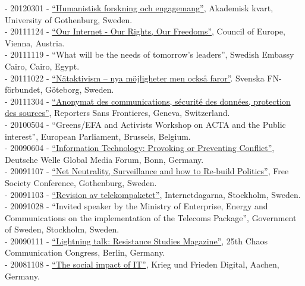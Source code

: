 \documentclass[a4paper,11pt,oneside]{article}
\begin{document}
    - 20120301 - \href{http://www.youtube.com/watch?v=-HYfVmanye8}{``Humanistisk forskning och engagemang''}, Akademisk kvart, University of Gothenburg, Sweden. \\
    - 20111124 - \href{https://www.youtube.com/watch?v=zWROWpMaKmE}{``Our Internet - Our Rights, Our Freedoms''}, Council of Europe, Vienna, Austria. \\
    - 20111119 - ``What will be the needs of tomorrow's leaders'', Swedish Embassy Cairo, Cairo, Egypt. \\
    - 20111022 - \href{http://www.youtube.com/watch?v=6Mi0g93ModU}{``Nätaktivism – nya möjligheter men också faror''}. Svenska FN-förbundet, Göteborg, Sweden. \\
    - 20111304 - \href{http://www.rsf-ch.ch/anonymat-des-communications-s%C3%A9curit%C3%A9-des-donn%C3%A9es-protection-des-sources-0}{``Anonymat des communications, sécurité des données, protection des sources''}, Reporters Sans Frontieres, Geneva, Switzerland. \\
    - 20100504 - ``Greens/EFA and Activists Workshop on ACTA and the Public interest'', European Parliament, Brussels, Belgium. \\
    - 20090604 - \href{https://issuu.com/deutsche-welle/docs/program-deutsche-welle-global-media-forum-2009}{``Information Technology: Provoking or Preventing Conflict''}, Deutsche Welle Global Media Forum, Bonn, Germany. \\
    - 20091107 - \href{https://vimeo.com/10286077}{``Net Neutrality, Surveillance and how to Re-build Politics''}, Free Society Conference, Gothenburg, Sweden. \\
    - 20091103 - \href{https://internetdagarna.se/arkiv/2009/program-2009/3-november.html}{``Revision av telekompaketet''}, Internetdagarna, Stockholm, Sweden. \\
    - 20091028 - ``Invited speaker by the Ministry of Enterprise, Energy and Communications on the implementation of the Telecoms Package'', Government of Sweden, Stockholm, Sweden.\\
    - 20090111 - \href{https://www.youtube.com/watch?v=G9cXIKvywvs}{``Lightning talk: Resistance Studies Magazine''}, 25th Chaos Communication Congress, Berlin, Germany.\\
    - 20081108 - \href{http://www.fiff.de/veranstaltungen/fiff-jahrestagungen/fiff-jahrestagung-2008-krieg-und-frieden-digital/Programmheft.pdf/at_download/file}{``The social impact of IT''}, Krieg und Frieden Digital, Aachen, Germany.
\end{document}
